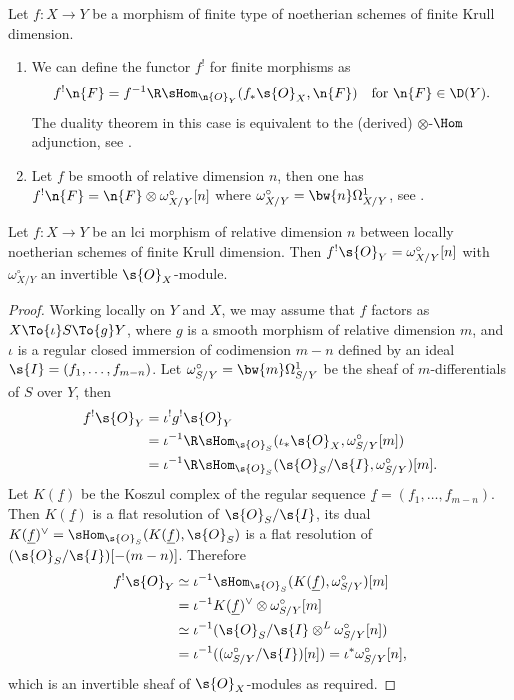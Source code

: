 \begin{exam}
\label{ExampleDualizingSheaf}
Let $f:X\to Y$ be a morphism of finite type of noetherian schemes of finite Krull dimension.
\begin{enumerate}
\item\label{ExampleDualizingSheaf1} We can define the functor $f^!$ for finite morphisms as
\[
f^!\n{F}=f^{-1} \R \sHom_{\n{O}_Y}(f_*\s{O}_X, \n{F}) \quad\text{for } \n{F}\in \D(Y).
\]
The duality theorem in this case is equivalent to the (derived) $\otimes$-$\Hom$ adjunction, see \cite[\S III.6]{hartshorne1966residues}.

\item\label{ExampleDualizingSheaf2} Let $f$ be smooth of relative dimension $n$, then one has $f^!\n{F}=\n{F}\otimes \omega_{X/Y}^{\circ}[n]$ where $\omega_{X/Y}^{\circ}=\bw{n} \Omega^1_{X/Y}$, see \cite[\S III.2]{hartshorne1966residues}.
\end{enumerate}
\end{exam}

\begin{lem}
\label{fOy}
Let $f: X\to Y$ be an lci morphism of relative dimension $n$ between locally noetherian schemes of finite Krull dimension. Then $f^!\s{O}_Y = \omega^{\circ}_{X/Y}[n]$ with $\omega^{\circ}_{X/Y}$ an invertible $\s{O}_X$-module.
\end{lem}

\begin{proof}
Working locally on $Y$ and $X$, we may assume that $f$ factors as $X \To{\iota} S \To{g} Y$, where $g$ is a smooth morphism of relative dimension $m$, and $\iota$ is a regular closed immersion of codimension $m-n$ defined by an ideal $\s{I}=(f_1,\ldots, f_{m-n})$. Let $\omega^{\circ}_{S/Y}=\bw{m}\Omega^{1}_{S/Y}$ be the sheaf of $m$-differentials of $S$ over $Y$, then
\begin{align*}
f^!\s{O}_Y & = \iota^! g^! \s{O}_Y \\
		 & = \iota^{-1} \R \sHom_{\s{O}_S}(\iota_* \s{O}_X, \omega_{S/Y}^\circ[m]) \\
		 & = \iota^{-1} \R \sHom_{\s{O}_S}(\s{O}_S/\s{I}, \omega_{S/Y}^\circ)[m].
\end{align*}
Let $K(\underline{f})$ be the Koszul complex of the regular sequence $\underline{f}=(f_1,\ldots, f_{m-n})$. Then $K(\underline{f})$ is a flat resolution of $\s{O}_S/\s{I}$, its dual $K(\underline{f})^\vee=\sHom_{\s{O}_S}(K(\underline{f}), \s{O}_S)$ is a flat resolution of \mbox{\((\s{O}_S/\s{I})[-(m-n)]\)}. Therefore
\begin{align*}
f^!\s{O}_Y & \simeq \iota^{-1} \sHom_{\s{O}_S}(K(\underline{f}), \omega^\circ_{S/Y})[m] \\
		 & = \iota^{-1} K(\underline{f})^\vee \otimes \omega^\circ_{S/Y} [m] \\
		 & \simeq \iota^{-1}(\s{O}_{S}/\s{I}\otimes ^L \omega^\circ_{S/Y}[n]) \\
		 & = \iota^{-1}((\omega^\circ_{S/Y}/\s{I})[n]) = \iota^* \omega^{\circ}_{S/Y}[n],
\end{align*}
which is an invertible sheaf of $\s{O}_X$-modules as required.
\end{proof}

